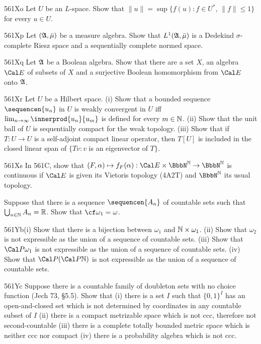 {\spheader 561Xo Let $U$ be an $L$-space.
Show that $\|u\|=\sup\{f(u):f\in U^*$, $\|f\|\le 1\}$ for every $u\in U$.

\spheader 561Xp Let $(\frak A,\bar\mu)$ be a measure algebra.   Show that
$L^1(\frak A,\bar\mu)$ is a Dedekind $\sigma$-complete Riesz space and a
sequentially complete normed space.

\spheader 561Xq Let $\frak A$ be a Boolean algebra.   Show that there are a
set $X$, an algebra $\Cal E$ of subsets of $X$ and a surjective Boolean
homomorphism from $\Cal E$ onto $\frak A$.   

\spheader 561Xr Let $U$ be a Hilbert space.
(i) Show that a bounded sequence
$\sequencen{u_n}$ in $U$ is weakly convergent in $U$ iff
$\lim_{n\to\infty}\innerprod{u_n}{u_m}$ is defined for every
$m\in\Bbb N$.
(ii) Show that the unit ball
of $U$ is sequentially compact for the weak topology.   (iii)
Show that if
$T:U\to U$ is a self-adjoint compact linear operator, then $T[U]$ is
included in the closed linear span of $\{Tv:v$ is an eigenvector of $T\}$.

\spheader 561Xs 
In 561C, show that $(F,\alpha)\mapsto f_F(\alpha):\Cal E\times\NN\to\NN$ is
continuous if $\Cal E$ is given its Vietoris topology (4A2T) and
$\NN$ its usual topology.

Suppose that there is a sequence $\sequencen{A_n}$ of
countable sets such that $\bigcup_{n\in\Bbb N}A_n=\Bbb R$.   Show that
$\cf\omega_1=\omega$.

\spheader 561Yb(i) Show that there is a bijection between $\omega_1$ and
$\Bbb N\times\omega_1$.   (ii) Show that $\omega_2$ is not expressible as the
union of a sequence of
countable sets.   (iii) Show that $\Cal P\omega_1$ is not expressible as the
union of a sequence of
countable sets.   (iv) Show that $\Cal P(\Cal P\Bbb N)$ is not
expressible as the union of a sequence of countable sets.

\spheader 561Yc Suppose there is a countable family of doubleton
sets with no choice function ({\smc Jech 73}, \S5.5).   Show that
(i) there is
a set $I$ such that $\{0,1\}^I$ has an open-and-closed set which is not
determined by coordinates in any countable subset of $I$ (ii) there is a
compact metrizable space which is not ccc, therefore not second-countable
(iii) there is a complete totally bounded metric space which is neither ccc
nor compact (iv) there is a probability algebra which is not ccc.

}
